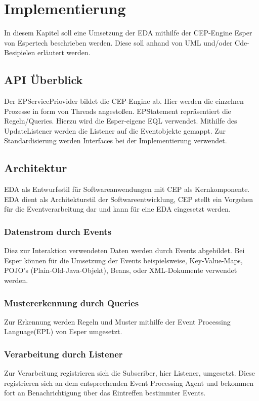 \chapter{Implementierung}

In diesem Kapitel soll eine Umsetzung der EDA mithilfe der CEP-Engine Esper von Espertech beschrieben werden.
Diese soll anhand von UML und/oder Cde-Besipielen erläutert werden.

\section{API Überblick}

Der EPServicePriovider bildet die CEP-Engine ab. Hier werden die einzelnen Prozesse in form von Threads angestoßen.
EPStatement repräsentiert die Regeln/Queries. Hierzu wird die Esper-eigene EQL verwendet.
Mithilfe des UpdateListener werden die Listener auf die Eventobjekte gemappt. Zur Standardisierung werden Interfaces bei der Implementierung verwendet.

\section{Architektur}

EDA als Entwurfsstil für Softwareanwendungen mit CEP als Kernkomponente. EDA dient als Architekturstil der Softwareentwicklung, CEP stellt ein Vorgehen für die Eventverarbeitung dar und kann für eine EDA eingesetzt werden.

\subsection{Datenstrom durch Events}

Diez zur Interaktion verwendeten Daten werden durch Events abgebildet. Bei Esper können für die Umsetzung der Events beispielsweise, Key-Value-Maps, POJO's (Plain-Old-Java-Objekt), Beans, oder XML-Dokumente verwendet werden. \cite[13]{EsperRef2018}	

\subsection{Mustererkennung durch Queries}

Zur Erkennung werden Regeln und Muster mithilfe der Event Processing Language(EPL) von Esper umgesetzt.

\subsection{Verarbeitung durch Listener}

Zur Verarbeitung registrieren sich die Subscriber, hier Listener, umgesetzt. Diese registrieren sich an dem entsprechenden Event Processing Agent und bekommen fort an Benachrichtigung über das Eintreffen bestimmter Events.

